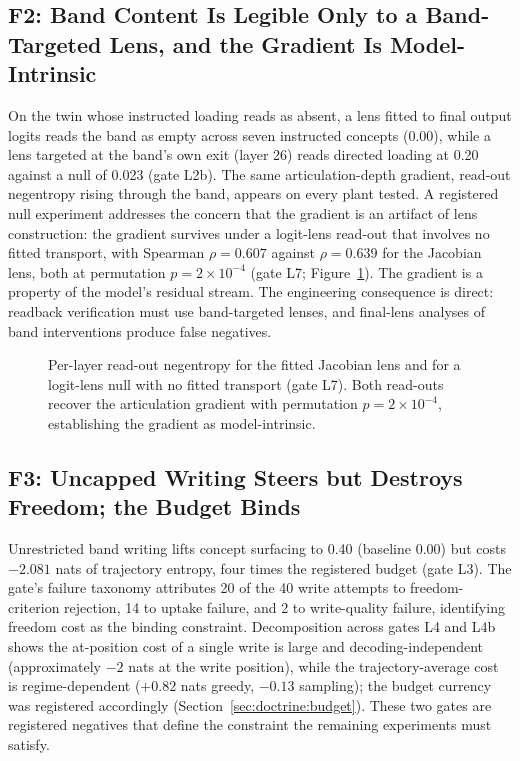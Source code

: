 \subsection{F2: Band Content Is Legible Only to a Band-Targeted Lens, and the Gradient Is Model-Intrinsic}
\label{sec:results:articulation}

On the twin whose instructed loading reads as absent, a lens fitted to final output logits reads the band as empty across seven instructed concepts (0.00), while a lens targeted at the band's own exit (layer 26) reads directed loading at 0.20 against a null of 0.023 (gate L2b). The same articulation-depth gradient, read-out negentropy rising through the band, appears on every plant tested. A registered null experiment addresses the concern that the gradient is an artifact of lens construction: the gradient survives under a logit-lens read-out that involves no fitted transport, with Spearman $\rho = 0.607$ against $\rho = 0.639$ for the Jacobian lens, both at permutation $p = 2 \times 10^{-4}$ (gate L7; Figure~\ref{fig:articulation}). The gradient is a property of the model's residual stream. The engineering consequence is direct: readback verification must use band-targeted lenses, and final-lens analyses of band interventions produce false negatives.

\begin{figure}[t]
\centering
\resizebox{\columnwidth}{!}{}
\caption{Per-layer read-out negentropy for the fitted Jacobian lens and for a logit-lens null with no fitted transport (gate L7). Both read-outs recover the articulation gradient with permutation $p=2\times10^{-4}$, establishing the gradient as model-intrinsic.}
\label{fig:articulation}
\end{figure}

\subsection{F3: Uncapped Writing Steers but Destroys Freedom; the Budget Binds}
\label{sec:results:budget}

Unrestricted band writing lifts concept surfacing to 0.40 (baseline 0.00) but costs $-2.081$ nats of trajectory entropy, four times the registered budget (gate L3). The gate's failure taxonomy attributes 20 of the 40 write attempts to freedom-criterion rejection, 14 to uptake failure, and 2 to write-quality failure, identifying freedom cost as the binding constraint. Decomposition across gates L4 and L4b shows the at-position cost of a single write is large and decoding-independent (approximately $-2$ nats at the write position), while the trajectory-average cost is regime-dependent ($+0.82$ nats greedy, $-0.13$ sampling); the budget currency was registered accordingly (Section~\ref{sec:doctrine:budget}). These two gates are registered negatives that define the constraint the remaining experiments must satisfy.

